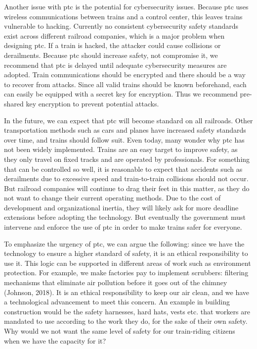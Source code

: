 \documentclass[11pt, titlepage]{article}
\begin{document}
Another issue with \gls{ptc} is the potential for cybersecurity issues. Because
\gls{ptc} uses wireless communications between trains and a control center, this
leaves trains vulnerable to hacking. Currently no consistent cybersecurity safety
standards exist across different railroad companies, which is a major problem when
designing \gls{ptc}. If a train is hacked, the attacker could cause collisions or
derailments. Because \gls{ptc} should increase safety, not compromise it, we
recommend that \gls{ptc} is delayed until adequate cybersecurity measures are
adopted. Train communications should be encrypted and there should be a way to
recover from attacks. Since all valid trains should be known beforehand, each can
easily be equipped with a secret key for encryption. Thus we recommend pre-shared
key encryption to  prevent potential attacks.

In the future, we can expect that \gls{ptc} will become standard on all railroads.
Other transportation methods such as cars and planes have increased safety standards
over time, and trains should follow suit. Even today, many wonder why \gls{ptc} has
not been widely implemented. Trains are an easy target to improve safety, as they
only travel on fixed tracks and are operated by professionals. For something that
can be controlled so well, it is reasonable to expect that accidents such as
derailments due to excessive speed and train-to-train collisions should not occur.
But railroad companies will continue to drag their feet in this matter, as they do
not want to change their current operating methods. Due to the cost of development
and organizational inertia, they will likely ask for more deadline extensions before
adopting the technology. But eventually the government must intervene and enforce
the use of \gls{ptc} in order to make trains safer for everyone.

To emphasize the urgency of \gls{ptc}, we can argue the following: since we have the
technology to ensure a higher standard of safety, it is an ethical responsibility to
use it. This logic can be supported in different areas of work such as environment
protection. For example, we make factories pay to implement scrubbers: filtering
mechanisms that eliminate air pollution before it goes out of the chimney (Johnson,
2018). It is an ethical responsibility to keep our air clean, and we have a
technological advancement to meet this concern. An example in building construction
would be the safety harnesses, hard hats, vests etc. that workers are mandated to
use according to the work they do, for the sake of their own safety. Why would we
not want the same level of safety for our train-riding citizens when we have the
capacity for it?
\end{document}
